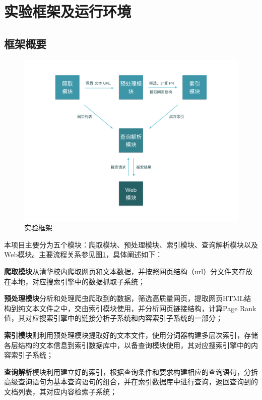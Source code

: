 \documentclass[paper=a4, fontsize=11pt, UTF8]{article} %
\numberwithin{equation}{section} %
\numberwithin{figure}{section} %
\numberwithin{table}{section} %
\begin{document}
\section{实验框架及运行环境}

\subsection{框架概要}

\begin{figure}[htp]
\center
\includegraphics[width=\textwidth]{arch}
\caption{实验框架} \label{relation}
\end{figure}

本项目主要分为五个模块：爬取模块、预处理模块、索引模块、查询解析模块以及Web模块。主要流程关系参见图\ref{relation}，具体阐述如下：

\textbf{爬取模块}从清华校内爬取网页和文本数据，并按照网页结构（url）分文件夹存放在本地，对应搜索引擎中的数据抓取子系统；

\textbf{预处理模块}分析和处理爬虫爬取到的数据，筛选高质量网页，提取网页HTML结构到纯文本文件之中，交由索引模块使用，并分析网页链接结构，计算Page Rank值，其对应搜索引擎中的链接分析子系统和内容索引子系统的一部分；

\textbf{索引模块}则利用预处理模块提取好的文本文件，使用分词器构建多层次索引，存储各层结构的文本信息到索引数据库中，以备查询模块使用，其对应搜索引擎中的内容索引子系统；

\textbf{查询解析}模块利用建立好的索引，根据查询条件和要求构建相应的查询语句，分拆高级查询语句为基本查询语句的组合，并在索引数据库中进行查询，返回查询到的文档列表，其对应内容检索子系统；
\end{document}
